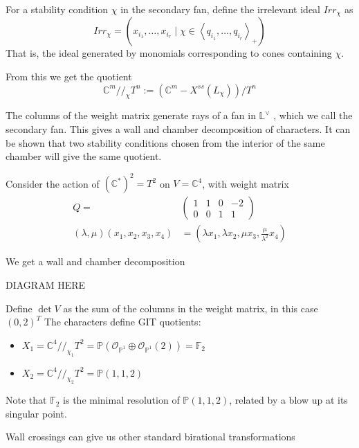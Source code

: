 \begin{definition}
	For a stability condition $\chi$ in the secondary fan, define the irrelevant ideal $Irr_\chi$ as $$
Irr_{\chi}= (x_{i_{1}},\dots,x_{i_{r}} \mid \chi \in \left< q_{i_{1}},\dots,q_{i_{r}}\right>_{+} )
$$ That is, the ideal generated by monomials corresponding to cones containing $\chi$. 
\end{definition}

From this we get the quotient $$
\mathbb{C}^{m}//_{\chi}T^{n}:= \left(\mathbb{C}^{m}-X^{ss}(L_{\chi})\right)  /T^n
$$

The columns of the weight matrix generate rays of a fan in $\mathbb{L}^\vee$ , which we call the secondary fan. This gives a wall and chamber decomposition of characters. It can be shown that two stability conditions chosen from the interior of the same chamber will give the same quotient. 

\begin{example}{}{}
	Consider the action of $(\mathbb{C}^{*})^{2}= T^2$ on $V = \mathbb{C}^4$, with weight matrix
\begin{align*}
Q = &\begin{pmatrix}1&1&0&-2 \\ 0&0&1&1\end{pmatrix} \\
(\lambda,\mu)(x_1,x_2,x_3,x_{4})&= \left( \lambda x_{1}, \lambda x_{2},\mu x_{3}, \frac{\mu}{\lambda^{2}}x_4 \right)
\end{align*}

We get a wall and chamber decomposition 

DIAGRAM HERE

Define $\det V$ as the sum of the columns in the weight matrix, in this case $(0,2)^T$
The characters define GIT quotients: 
\begin{itemize}
	\item  $X_{1}= \mathbb{C}^{4}//_{\chi_{1}}T^{2}= \mathbb{P}(\mathcal{O}_{\mathbb{P}^{1}}\oplus \mathcal{O}_{\mathbb{P}^{1}}(2)) = \mathbb{F}_2$
	\item  $X_{2}= \mathbb{C}^{4}//_{\chi_{2}}T^{2}= \mathbb{P}(1,1,2)$
\end{itemize}

Note that $\mathbb{F}_2$ is the minimal resolution of $\mathbb{P}(1,1,2)$, related by a blow up at its singular point.
\end{example}

Wall crossings can give us other standard birational transformations

